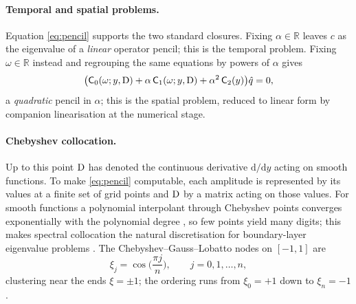 \documentclass[11pt]{article}
\begin{document}
\paragraph{Temporal and spatial problems.} Equation \eqref{eq:pencil} supports the two standard
closures. Fixing $\alpha\in\mathbb R$ leaves $c$ as the eigenvalue of a \emph{linear} operator
pencil; this is the temporal problem. Fixing $\omega\in\mathbb R$ instead and regrouping the same equations
by powers of $\alpha$ gives
\begin{equation}\label{eq:spatial}
  \big(\mathsf C_0(\omega;y,\mathrm{D})+\alpha\,\mathsf C_1(\omega;y,\mathrm{D})+\alpha^2\,\mathsf C_2(y)\big)\hat{q}=0,
\end{equation}
a \emph{quadratic} pencil in $\alpha$; this is the spatial problem, reduced to linear form by
companion linearisation at the numerical stage.

\paragraph{Chebyshev collocation.} Up to this point $\mathrm{D}$ has denoted the continuous derivative
$\mathrm d/\mathrm dy$ acting on smooth functions. To make \eqref{eq:pencil} computable, each
amplitude is represented by its values at a finite set of grid points and $\mathrm{D}$ by a matrix acting
on those values. For smooth functions a polynomial interpolant through Chebyshev points converges
exponentially with the polynomial degree \cite{orszag1971,trefethen2000}, so few points yield many
digits; this makes spectral collocation the natural discretisation for boundary-layer eigenvalue
problems \cite{malik1990}. The Chebyshev--Gauss--Lobatto nodes on $[-1,1]$ are
\begin{equation}\label{eq:gll}
  \xi_j=\cos\!\Big(\frac{\pi j}{n}\Big),\qquad j=0,1,\dots,n,
\end{equation}
clustering near the ends $\xi=\pm1$; the ordering runs from $\xi_0=+1$ down to $\xi_n=-1$.
\end{document}
